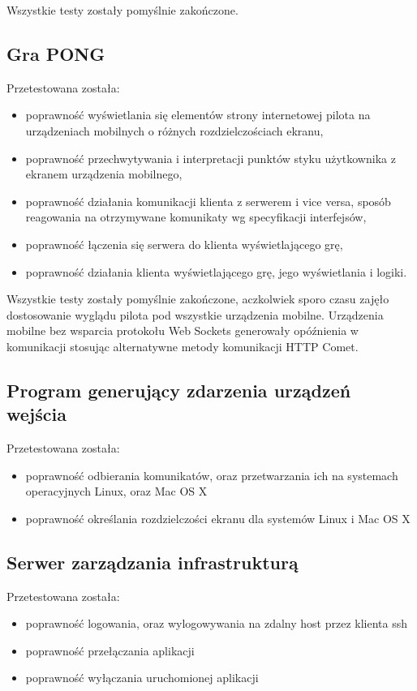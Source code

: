 Wszystkie testy zostały pomyślnie zakończone.

\subsection{Gra PONG}

Przetestowana została:

\begin{itemize}
	\item poprawność wyświetlania się elementów strony internetowej pilota na urządzeniach mobilnych o różnych rozdzielczościach ekranu,
	\item poprawność przechwytywania i interpretacji punktów styku użytkownika z ekranem urządzenia mobilnego,
	\item poprawność działania komunikacji klienta z serwerem i vice versa, sposób reagowania na otrzymywane komunikaty wg specyfikacji interfejsów,
	\item poprawność łączenia się serwera do klienta wyświetlającego grę,
	\item poprawność działania klienta wyświetlającego grę, jego wyświetlania i logiki.
\end{itemize}

Wszystkie testy zostały pomyślnie zakończone, aczkolwiek sporo czasu zajęło dostosowanie wyglądu pilota pod wszystkie urządzenia mobilne. Urządzenia mobilne bez wsparcia protokołu Web Sockets generowały opóźnienia w komunikacji stosując alternatywne metody komunikacji HTTP Comet.

\subsection{Program generujący zdarzenia urządzeń wejścia}
Przetestowana została:
\begin{itemize}
	\item poprawność odbierania komunikatów, oraz przetwarzania ich na systemach operacyjnych Linux, oraz Mac OS X
	\item poprawność określania rozdzielczości ekranu dla systemów Linux i Mac OS X
\end{itemize}

\subsection{Serwer zarządzania infrastrukturą}

Przetestowana została:
\begin{itemize}
	\item poprawność logowania, oraz wylogowywania na zdalny host przez klienta ssh
	\item poprawność przełączania aplikacji 
	\item poprawność wyłączania uruchomionej aplikacji
\end{itemize}

